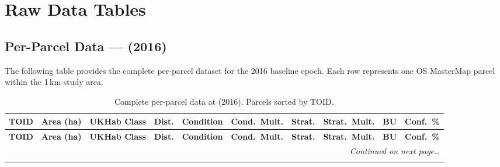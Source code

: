 \chapter{Raw Data Tables}
\label{app:data}

\section{Per-Parcel Data — \Tzero{} (2016)}

The following table provides the complete per-parcel dataset for the 2016 baseline epoch. Each row represents one OS MasterMap parcel within the 1\,km study area.

\begin{landscape}
\begin{longtable}{p{18mm}p{12mm}p{22mm}p{10mm}p{14mm}p{12mm}p{10mm}p{10mm}p{10mm}p{10mm}}
\caption{Complete per-parcel data at \Tzero{} (2016). Parcels sorted by TOID.}
\label{tab:raw-t0} \\
\toprule
\textbf{TOID} & \textbf{Area (ha)} & \textbf{UKHab Class} & \textbf{Dist.} & \textbf{Condition} & \textbf{Cond.~Mult.} & \textbf{Strat.} & \textbf{Strat.~Mult.} & \textbf{BU} & \textbf{Conf.~\%} \\
\midrule
\endfirsthead
\toprule
\textbf{TOID} & \textbf{Area (ha)} & \textbf{UKHab Class} & \textbf{Dist.} & \textbf{Condition} & \textbf{Cond.~Mult.} & \textbf{Strat.} & \textbf{Strat.~Mult.} & \textbf{BU} & \textbf{Conf.~\%} \\
\midrule
\endhead
\midrule
\multicolumn{10}{r}{\small\itshape Continued on next page\ldots} \\
\bottomrule
\endfoot
\bottomrule
\endlastfoot


\end{longtable}
\end{landscape}
